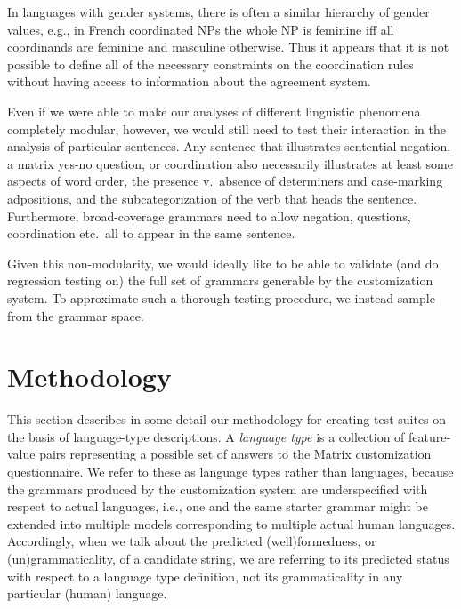\documentclass[11pt]{article}
\begin{document}
%
In languages with gender systems, there is often a similar hierarchy
of gender values, e.g., in French coordinated NPs the whole NP is feminine
iff all coordinands are feminine and masculine otherwise.  Thus
it appears that it is not possible to define all of the necessary
constraints on the coordination rules without having access to information
about the agreement system.  

Even if we were able to make our analyses of different linguistic
phenomena completely modular, however, we would still need to test
their interaction in the analysis of particular sentences.
Any sentence that illustrates sentential negation, a matrix yes-no
question, or coordination also necessarily illustrates at least some
aspects of word order, the presence v.\ absence of determiners and
case-marking adpositions, and the subcategorization of the verb that
heads the sentence.  Furthermore, broad-coverage grammars need to
allow negation, questions, coordination etc.\ all to appear in the
same sentence.

Given this non-modularity, we would ideally like to be able to
validate (and do regression testing on) the full set of grammars
generable by the customization system.  To approximate such a thorough
testing procedure, we instead sample from the grammar space.

\section{Methodology}
\label{arch}

This section describes in some detail our methodology for creating
test suites on the basis of language-type descriptions.  A {\it
language type} is a collection of feature-value pairs representing a
possible set of answers to the Matrix customization questionnaire. We
refer to these as language types rather than languages, because the
grammars produced by the customization system are underspecified with
respect to actual languages, i.e., one and the same starter grammar
might be extended into multiple models corresponding to multiple
actual human languages.  Accordingly, when we talk about the predicted
(well)formedness, or (un)grammaticality, of a candidate string, we are referring to its
predicted status with respect to a language type definition, not its
grammaticality in any particular (human) language.
\end{document}
